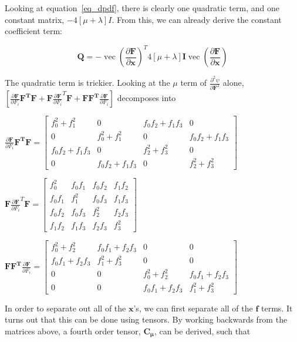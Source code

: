 \documentclass[twocolumn,10pt]{asme2ej}
\DeclareMathOperator{\vect}{vec}
\begin{document}
Looking at equation~\ref{eq_dpdf}, there is clearly one quadratic term, and one constant matrix, $-4[\mu + \lambda]I$. From this, we can already derive the constant coefficient term:

\begin{equation}
  \bm{Q} = - \vect \left(\frac{\partial \bm{F}}{\partial \bm{x}}\right)^T 4[\mu + \lambda]\bm{I} \vect \left(\frac{\partial \bm{F}}{\partial \bm{x}}\right)
  \label{eq_unreducedConst}
\end{equation}

The quadratic term is trickier. Looking at the $\mu$ term of $\frac{\partial^2 \psi}{\partial \bm{F}^2}$ alone, $\left[\frac{\partial \bm{F}}{\partial F_i}\bm{F^TF} + \bm{F}\frac{\partial \bm{F}}{\partial F_i}^T\bm{F} + \bm{FF^T}\frac{\partial \bm{F}}{\partial F_i}\right]$ decomposes into

\begin{center}
$\frac{\partial \bm{F}}{\partial F_i}\bm{F^TF} = \begin{bmatrix} f_{0}^2 + f_{1}^2 & 0 & f_0f_2 + f_1f_3 & 0 \\
0 & f_{0}^2 + f_{1}^2 & 0 & f_0f_2 + f_1f_3 \\
f_0f_2 + f_1f_3 & 0 & f_{2}^2 + f_{3}^2 & 0 \\
0 & f_0f_2 + f_1f_3 & 0 & f_{2}^2 + f_{3}^2 \end{bmatrix}$

\bigskip
$\bm{F}\frac{\partial \bm{F}}{\partial F_i}^T\bm{F} = \begin{bmatrix} f_{0}^2 & f_0f_1 & f_0f_2 & f_1f_2  \\
f_0f_1 & f_{1}^2 & f_0f_3 & f_1f_3 \\
f_0f_2 & f_0f_3 & f_{2}^2 & f_2f_3 \\
f_1f_2 & f_1f_3 & f_2f_3 & f_{3}^2 \end{bmatrix}$

\bigskip
$\bm{FF^T}\frac{\partial \bm{F}}{\partial F_i} = \begin{bmatrix} f_{0}^2 + f_{2}^2 & f_0f_1 + f_2f_3 & 0 & 0  \\
f_0f_1 + f_2f_3 & f_{1}^2 + f_{3}^2 & 0 & 0 \\
0 & 0 & f_{0}^2 + f_{2}^2 & f_0f_1 + f_2f_3 \\
0 & 0 & f_0f_1 + f_2f_3 & f_{1}^2 + f_{3}^2 \end{bmatrix}$
\end{center}

In order to separate out all of the $\bm{x}$'s, we can first separate all of the $\bm{f}$ terms. It turns out that this can be done using tensors. By working backwards from the matrices above, a fourth order tensor, $\bm{C_{\mu}}$, can be derived, such that
\end{document}
